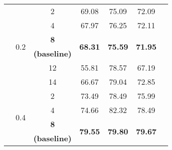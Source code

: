 \begin{sidewaystable}
\begin{adjustbox}{totalheight=0.85\textheight, width=\textwidth, keepaspectratio}
\begin{tabularx}{1.4\textwidth}{Xcccccc}
                                                       & \multirow{6}{*}{0.2}  & 2                        & 69.08                           & 75.09                           & 72.09                           &                                 \\ 
                                                       &                       & 4                        & 67.97                           & 76.25                           & 72.11                           &                                 \\ 
                                                       &                       & \textbf{8}               & \multirow{2}{*}{\textbf{68.31}} & \multirow{2}{*}{\textbf{75.59}} & \multirow{2}{*}{\textbf{71.95}} &                                 \\
                                                       &                       & \textbf{(baseline)}      &                                 &                                 &                                 &                                 \\ 
                                                       &                       & 12                       & 55.81                           & 78.57                           & 67.19                           &                                 \\ 
                                                       &                       & 14                       & 66.67                           & 79.04                           & 72.85                           &                                 \\ 
                                                       & \multirow{6}{*}{0.4}  & 2                        & 73.49                           & 78.49                           & 75.99                           &                                 \\ 
                                                       &                       & 4                        & 74.66                           & 82.32                           & 78.49                           &                                 \\ 
                                                       &                       & \textbf{8}               & \multirow{2}{*}{\textbf{79.55}} & \multirow{2}{*}{\textbf{79.80}}  & \multirow{2}{*}{\textbf{79.67}} &                                 \\
                                                       &                       & \textbf{(baseline)}      &                                 &                                 &                                 &                                 \\ 

\end{tabularx}
\end{adjustbox}
\end{sidewaystable}
